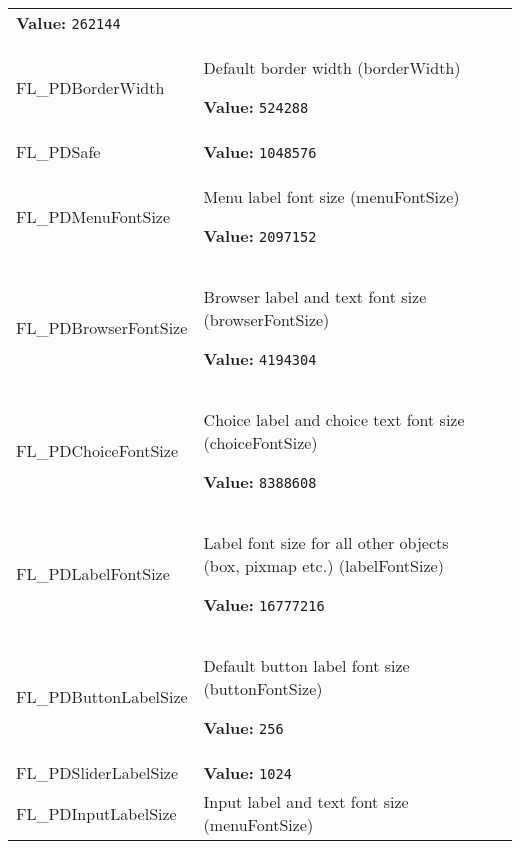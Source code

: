 \begin{longtable}{|p{\varnamewidth}|p{\vardescrwidth}|l}
\textbf{Value:} 
{\tt 262144}&\\
\cline{1-2}
\raggedright F\-L\-\_\-P\-D\-B\-o\-r\-d\-e\-r\-W\-i\-d\-t\-h\- & \raggedright Default border width (borderWidth)

\textbf{Value:} 
{\tt 524288}&\\
\cline{1-2}
\raggedright F\-L\-\_\-P\-D\-S\-a\-f\-e\- & \raggedright \textbf{Value:} 
{\tt 1048576}&\\
\cline{1-2}
\raggedright F\-L\-\_\-P\-D\-M\-e\-n\-u\-F\-o\-n\-t\-S\-i\-z\-e\- & \raggedright Menu label font size (menuFontSize)

\textbf{Value:} 
{\tt 2097152}&\\
\cline{1-2}
\raggedright F\-L\-\_\-P\-D\-B\-r\-o\-w\-s\-e\-r\-F\-o\-n\-t\-S\-i\-z\-e\- & \raggedright Browser label and text font size (browserFontSize)

\textbf{Value:} 
{\tt 4194304}&\\
\cline{1-2}
\raggedright F\-L\-\_\-P\-D\-C\-h\-o\-i\-c\-e\-F\-o\-n\-t\-S\-i\-z\-e\- & \raggedright Choice label and choice text font size (choiceFontSize)

\textbf{Value:} 
{\tt 8388608}&\\
\cline{1-2}
\raggedright F\-L\-\_\-P\-D\-L\-a\-b\-e\-l\-F\-o\-n\-t\-S\-i\-z\-e\- & \raggedright Label font size for all other objects (box, pixmap etc.) (labelFontSize)

\textbf{Value:} 
{\tt 16777216}&\\
\cline{1-2}
\raggedright F\-L\-\_\-P\-D\-B\-u\-t\-t\-o\-n\-L\-a\-b\-e\-l\-S\-i\-z\-e\- & \raggedright Default button label font size (buttonFontSize)

\textbf{Value:} 
{\tt 256}&\\
\cline{1-2}
\raggedright F\-L\-\_\-P\-D\-S\-l\-i\-d\-e\-r\-L\-a\-b\-e\-l\-S\-i\-z\-e\- & \raggedright \textbf{Value:} 
{\tt 1024}&\\
\cline{1-2}
\raggedright F\-L\-\_\-P\-D\-I\-n\-p\-u\-t\-L\-a\-b\-e\-l\-S\-i\-z\-e\- & \raggedright Input label and text font size (menuFontSize)


\end{longtable}
